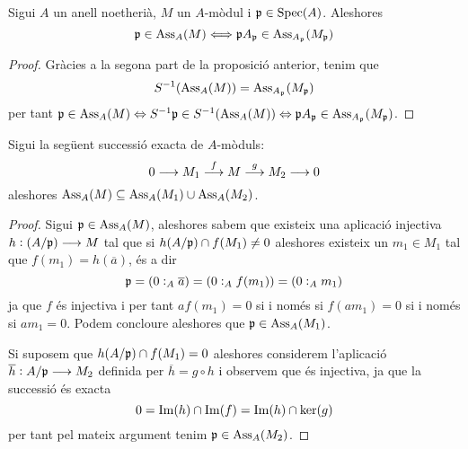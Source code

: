 \documentclass[../../../main.tex]{subfiles}
\begin{document}
\begin{coro}
Sigui $A$ un anell noetherià, $M$ un $A$-mòdul i $\mathfrak{p}\in\mathrm{Spec}(A)$. Aleshores
\begin{equation}
    \notag
    \mathfrak{p}\in\operatorname{Ass}_A(M)\Longleftrightarrow \mathfrak{p} A_{\mathfrak{p}}\in\operatorname{Ass}_{A_{\mathfrak{p}}}(M_{\mathfrak{p}})
\end{equation}
\end{coro}
\begin{proof}
Gràcies a la segona part de la proposició anterior, tenim que
\begin{equation}
    \notag
    S^{-1}(\operatorname{Ass}_A(M))=\operatorname{Ass}_{A_{\mathfrak{p}}}(M_{\mathfrak{p}})
\end{equation}
per tant $\mathfrak{p}\in\operatorname{Ass}_A(M)\Leftrightarrow S^{-1}\mathfrak{p}\in S^{-1}(\operatorname{Ass}_A(M))\Leftrightarrow \mathfrak{p} A_{\mathfrak{p}}\in \operatorname{Ass}_{A_{\mathfrak{p}}}(M_{\mathfrak{p}})$.
\end{proof}




\begin{prop}
\label{prop:associatsSuccessioExacta} Sigui la següent successió exacta de $A$-mòduls:
\begin{equation}
    \notag
    0\longrightarrow M_1\overset{f}{\longrightarrow}M\overset{g}{\longrightarrow}M_2\longrightarrow 0
\end{equation}
aleshores $\operatorname{Ass}_A(M)\subseteq \operatorname{Ass}_A(M_1)\cup \operatorname{Ass}_A(M_2)$.
\end{prop}
\begin{proof}
Sigui $\mathfrak{p}\in\operatorname{Ass}_A(M)$, aleshores sabem que existeix una aplicació injectiva $h:(A/\mathfrak{p})\longrightarrow M$ tal que si $h(A/\mathfrak{p})\cap f(M_1)\not=0$ aleshores existeix un $m_1\in M_1$ tal que $f(m_1) = h(\overline{a})$, és a dir
\begin{equation}
    \notag
    \mathfrak{p} = (0:_A\overline{a})=(0:_Af(m_1)) = (0:_Am_1)
\end{equation}
ja que $f$ és injectiva i per tant $af(m_1) = 0$ si i només si $f(am_1) = 0$ si i només si $am_1 = 0$. Podem concloure aleshores que $\mathfrak{p}\in \operatorname{Ass}_A(M_1)$.

Si suposem que $h(A/\mathfrak{p})\cap f(M_1) = 0$ aleshores considerem l'aplicació $\overline{h}:A/\mathfrak{p}\longrightarrow M_2$ definida per $\overline{h} = g\circ h$ i observem que és injectiva, ja que la successió és exacta
\begin{equation}
    \notag
    0 = \operatorname{Im}(h)\cap\operatorname{Im}(f) = \operatorname{Im}(h)\cap\ker(g)
\end{equation}
per tant pel mateix argument tenim $\mathfrak{p}\in\operatorname{Ass}_A(M_2)$.
\end{proof}
\end{document}

